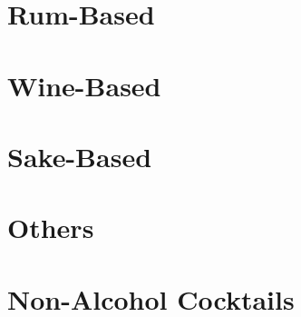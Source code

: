\documentclass[11pt,dvipdfmx]{article}
\begin{document}




\clearpage




\clearpage





\clearpage
\section{Rum-Based}





\clearpage




\clearpage
\section{Wine-Based}




\clearpage
\section{Sake-Based}





\clearpage




\clearpage
\section{Others}



\clearpage
\section{Non-Alcohol Cocktails}





\clearpage


\end{document}
